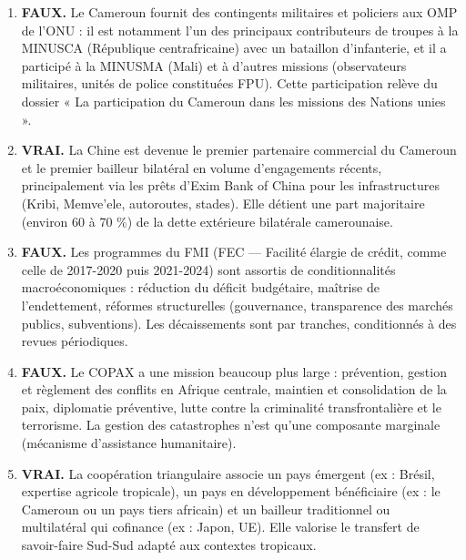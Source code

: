 \documentclass[11pt]{article}
\newcommand{\cle}[1]{{\popxbold\color{popdark}#1}}
\begin{document}
\begin{corrige}
\begin{enumerate}
    \item \textbf{FAUX.} Le Cameroun fournit des contingents militaires et policiers aux OMP de l'ONU : il est notamment l'un des principaux contributeurs de troupes à la MINUSCA (République centrafricaine) avec un bataillon d'infanterie, et il a participé à la MINUSMA (Mali) et à d'autres missions (observateurs militaires, unités de police constituées FPU). Cette participation relève du dossier « La participation du Cameroun dans les missions des Nations unies ».
    \item \textbf{VRAI.} La Chine est devenue le premier partenaire commercial du Cameroun et le premier bailleur bilatéral en volume d'engagements récents, principalement via les prêts d'Exim Bank of China pour les infrastructures (Kribi, Memve'ele, autoroutes, stades). Elle détient une part majoritaire (environ 60 à 70 \%) de la dette extérieure bilatérale camerounaise.
    \item \textbf{FAUX.} Les programmes du FMI (FEC — Facilité élargie de crédit, comme celle de 2017-2020 puis 2021-2024) sont assortis de \cle{conditionnalités} macroéconomiques : réduction du déficit budgétaire, maîtrise de l'endettement, réformes structurelles (gouvernance, transparence des marchés publics, subventions). Les décaissements sont par tranches, conditionnés à des revues périodiques.
    \item \textbf{FAUX.} Le COPAX a une mission beaucoup plus large : prévention, gestion et règlement des conflits en Afrique centrale, maintien et consolidation de la paix, diplomatie préventive, lutte contre la criminalité transfrontalière et le terrorisme. La gestion des catastrophes n'est qu'une composante marginale (mécanisme d'assistance humanitaire).
    \item \textbf{VRAI.} La coopération triangulaire associe un pays émergent (ex : Brésil, expertise agricole tropicale), un pays en développement bénéficiaire (ex : le Cameroun ou un pays tiers africain) et un bailleur traditionnel ou multilatéral qui cofinance (ex : Japon, UE). Elle valorise le transfert de savoir-faire Sud-Sud adapté aux contextes tropicaux.
\end{enumerate}
\end{corrige}
\end{document}

